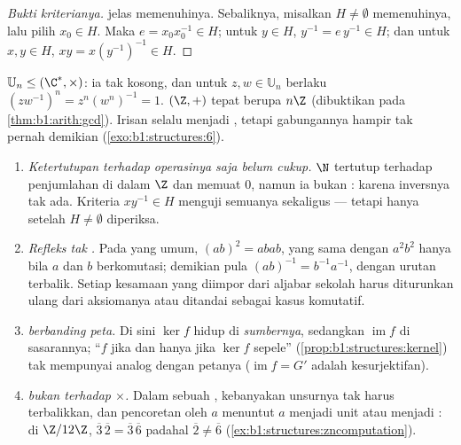 \begin{proof}[Bukti kriterianya]
 jelas memenuhinya. Sebaliknya, misalkan $H \neq \emptyset$
memenuhinya, lalu pilih $x_0 \in H$. Maka $e = x_0 x_0^{-1} \in H$; untuk
$y \in H$, $y^{-1} = e\,y^{-1} \in H$; dan untuk $x, y \in H$, $xy =
x (y^{-1})^{-1} \in H$.
\end{proof}

\begin{example}\label{ex:b1:structures:subgroups}
$\mathbb{U}_n \leq (\C^*, \times)$: ia tak kosong, dan untuk $z, w \in
\mathbb{U}_n$ berlaku $(zw^{-1})^n = z^n (w^n)^{-1} = 1$. 
$(\Z, +)$ tepat berupa $n\Z$ (dibuktikan pada
\cref{thm:b1:arith:gcd}). Irisan  selalu menjadi
, tetapi gabungannya hampir tak pernah demikian
(\cref{exo:b1:structures:6}).
\end{example}

\begin{remark}\label{rem:b1:structures:pitfalls}
\begin{enumerate}
  \item \emph{Ketertutupan terhadap operasinya saja belum cukup.}  $\N$
        tertutup terhadap penjumlahan di dalam $\Z$ dan memuat $0$, namun ia
        bukan : karena inversnya tak ada. Kriteria
        $xy^{-1} \in H$ menguji semuanya sekaligus --- tetapi hanya
        setelah $H \neq \emptyset$ diperiksa.
  \item \emph{Refleks tak .} Pada  yang umum, $(ab)^2 =
        abab$, yang sama dengan $a^2b^2$ hanya bila $a$ dan $b$ berkomutasi;
        demikian pula $(ab)^{-1} = b^{-1}a^{-1}$, dengan urutan terbalik.
        Setiap kesamaan yang diimpor dari aljabar sekolah harus
        diturunkan ulang dari aksiomanya atau ditandai sebagai kasus komutatif.
  \item \emph{ berbanding peta.} Di sini $\ker f$ hidup di
        \emph{sumbernya}, sedangkan $\operatorname{im} f$ di sasarannya;
        ``$f$  jika dan hanya jika $\ker f$ sepele''
        (\cref{prop:b1:structures:kernel}) tak mempunyai analog dengan
        petanya ($\operatorname{im} f = G'$ adalah kesurjektifan).
  \item \emph{ bukan  terhadap $\times$.} Dalam sebuah , kebanyakan
        unsurnya tak harus terbalikkan, dan pencoretan oleh $a$
        menuntut $a$ menjadi unit atau  menjadi : di $\Z/12\Z$, $\overline3\,\overline2 =
        \overline3\,\overline6$ padahal $\overline2 \neq \overline6$
        (\cref{ex:b1:structures:zncomputation}).
\end{enumerate}
\end{remark}

